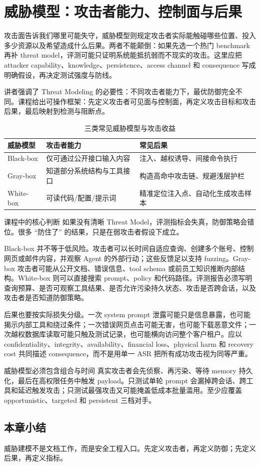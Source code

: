 \section{威胁模型：攻击者能力、控制面与后果}

攻击面告诉我们哪里可能失守，威胁模型则规定攻击者实际能触碰哪些位置、投入多少资源以及希望造成什么后果。两者不能颠倒：如果先选一个热门 benchmark 再补 threat model，评测可能只证明系统能抵抗弱而不现实的攻击。这里应把 attacker capability、knowledge、persistence、access channel 和 consequence 写成明确假设，再决定测试强度与防线。

讲者强调了 Threat Modeling 的必要性：不同攻击者能力下，最优防御完全不同。课程给出可操作框架：先定义攻击者可见面与控制面，再定义攻击目标和攻击后果，最后映射到检测与阻断点。

\begin{table}[H]
\centering
\begin{tabular}{p{2.2cm}p{4.1cm}p{4.6cm}}
\toprule
\textbf{威胁模型} & \textbf{攻击者能力} & \textbf{常见后果} \\
\midrule
Black-box & 仅可通过公开接口输入内容 & 注入、越权诱导、间接命令执行 \\
Gray-box & 知道部分系统结构与工具接口 & 构造高命中攻击链、规避浅层护栏 \\
White-box & 可读代码/配置/提示词 & 精准定位注入点、自动化生成攻击样本 \\
\bottomrule
\end{tabular}
\caption{三类常见威胁模型与攻击收益}
\end{table}

\begin{importantbox}{课程中的核心判断}
如果没有清晰 Threat Model，评测指标会失真，防御策略会错位。很多 ``防住了'' 的结果，只是在弱攻击者假设下成立。
\end{importantbox}

Black-box 并不等于低风险。攻击者可以长时间自适应查询、创建多个账号、控制网页或邮件内容，并观察 Agent 的外部行动；这些反馈足以支持 fuzzing。Gray-box 攻击者可能从公开文档、错误信息、tool schema 或前员工知识推断内部结构。White-box 则可以直接搜索 prompt、policy 和代码路径。评测报告必须写明查询预算、是否可观察工具结果、是否允许污染持久状态、攻击是否跨会话，以及攻击者是否知道防御策略。

后果也要按实际损失分级。一次 system prompt 泄露可能只是信息暴露，也可能揭示内部工具和绕过条件；一次错误网页点击可能无害，也可能下载恶意文件；一次越权数据库读取可能只触及测试记录，也可能横向访问整个客户租户。应以 confidentiality、integrity、availability、financial loss、physical harm 和 recovery cost 共同描述 consequence，而不是用单一 ASR 把所有成功攻击视为同等严重。

\begin{warningbox}{威胁模型必须包含组合与时间}
真实攻击者会先侦察、再污染、等待 memory 持久化，最后在高权限任务中触发 payload。只测试单轮 prompt 会漏掉跨会话、跨工具和延迟触发攻击；只测试最强攻击又可能掩盖低成本批量滥用。至少应覆盖 opportunistic、targeted 和 persistent 三档对手。
\end{warningbox}

\subsection{本章小结}
威胁建模不是文档工作，而是安全工程入口。先定义攻击者，再定义防御；先定义后果，再定义指标。

